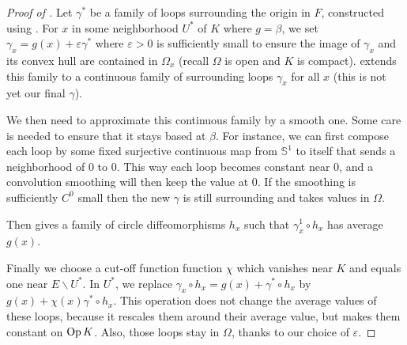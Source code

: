\begin{proof}[Proof of ]
  Let $γ^*$ be a family of loops surrounding the origin in $F$,
  constructed using .
  For $x$ in some neighborhood $U^*$ of $K$ where $g = β$, we set
  $γ_x = g(x) + εγ^*$ where $ε > 0$ is sufficiently small to ensure
  the image of $γ_x$ and its convex hull are contained in $Ω_x$ (recall $Ω$ is
  open and $K$ is compact).
   extends this family to a continuous
  family of surrounding loops $γ_x$ for all $x$ (this is not yet our
  final $γ$).

  We then need to approximate this continuous family by a smooth one.
  Some care is needed to ensure that it stays based at $β$.
  For instance, we can first compose each loop by some fixed surjective
  continuous map from $𝕊^1$ to itself that sends a neighborhood of $0$
  to $0$.
  This way each loop becomes constant near $0$, and a convolution
  smoothing will then keep the value at $0$.
  If the smoothing is sufficiently $C^0$ small then the new $γ$ is
  still surrounding and takes values in $Ω$.

  Then  gives a family of circle
  diffeomorphisms $h_x$ such that $γ^1_x ∘ h_x$ has average $g(x)$.

  Finally we choose a cut-off function function $χ$ which vanishes near
  $K$ and equals one near $E ∖ U^*$.  In $U^*$, we replace
  $γ_x ∘ h_x = g(x) + γ^* ∘ h_x$ by $g(x) + χ(x)γ^* ∘ h_x$. This
  operation does not change the average values of these loops, because
  it rescales them around their average value, but makes them constant
  on $\operatorname{Op}{K}$. Also, those loops stay in $Ω$, thanks to our choice of $ε$.
\end{proof}

